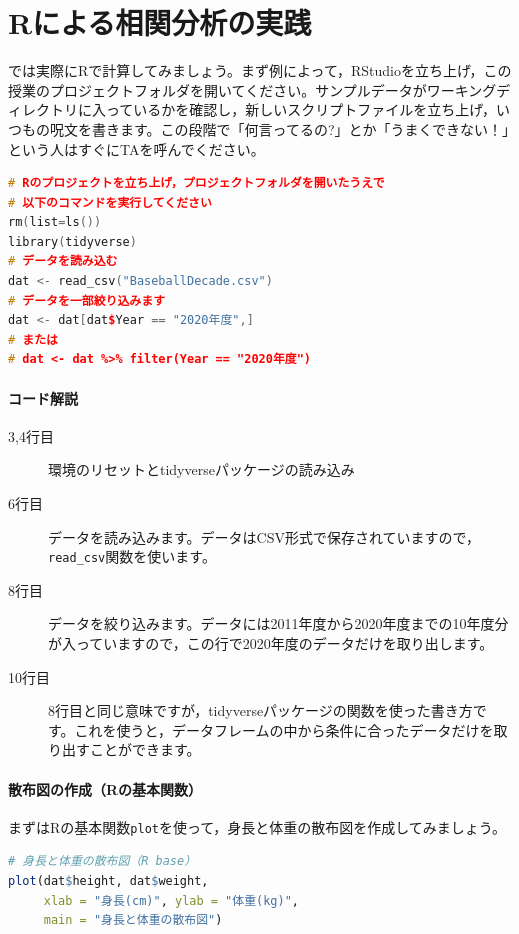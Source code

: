 \documentclass{ltjsbook}
\begin{document}
\section{Rによる相関分析の実践}

では実際にRで計算してみましょう。まず例によって，RStudioを立ち上げ，この授業のプロジェクトフォルダを開いてください。サンプルデータがワーキングディレクトリに入っているかを確認し，新しいスクリプトファイルを立ち上げ，いつもの呪文を書きます。この段階で「何言ってるの?」とか「うまくできない！」という人はすぐにTAを呼んでください。

\begin{lstlisting}[language=c++,label={code:06_01},caption={データの準備}]
# Rのプロジェクトを立ち上げ，プロジェクトフォルダを開いたうえで
# 以下のコマンドを実行してください
rm(list=ls())
library(tidyverse)
# データを読み込む
dat <- read_csv("BaseballDecade.csv")
# データを一部絞り込みます
dat <- dat[dat$Year == "2020年度",]
# または
# dat <- dat %>% filter(Year == "2020年度")
\end{lstlisting}

\paragraph{コード解説}
\begin{description}
    \item[3,4行目] 環境のリセットとtidyverseパッケージの読み込み
    \item[6行目] データを読み込みます。データはCSV形式で保存されていますので，\verb|read_csv|関数を使います。
    \item[8行目] データを絞り込みます。データには2011年度から2020年度までの10年度分が入っていますので，この行で2020年度のデータだけを取り出します。
    \item[10行目] 8行目と同じ意味ですが，tidyverseパッケージの関数を使った書き方です。これを使うと，データフレームの中から条件に合ったデータだけを取り出すことができます。
\end{description}

\paragraph{散布図の作成（Rの基本関数）}
まずはRの基本関数\verb|plot|を使って，身長と体重の散布図を作成してみましょう。

\begin{lstlisting}[language=R,label={code:06_02},caption={R baseによる散布図の作成}]
# 身長と体重の散布図（R base）
plot(dat$height, dat$weight,
     xlab = "身長(cm)", ylab = "体重(kg)",
     main = "身長と体重の散布図")
\end{lstlisting}
\end{document}

